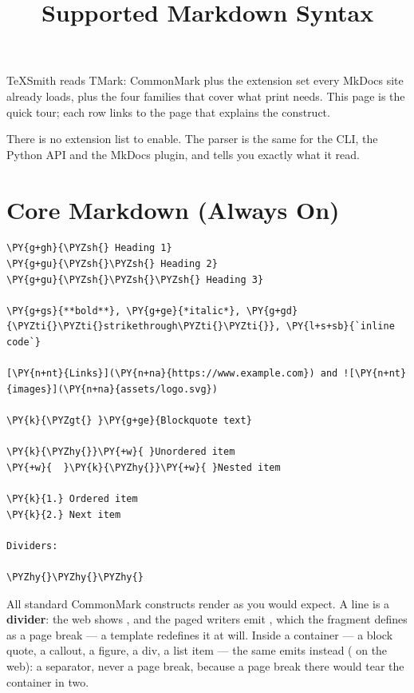 \documentclass[a4paper,twoside]{article}
\title{Supported Markdown Syntax}
\author{}\date{}
\begin{document}
\maketitle
TeXSmith reads TMark: CommonMark plus the extension set every
MkDocs site already loads, plus the four families that cover what print needs.
This page is the quick tour; each row links to the page that explains the
construct.
\begin{tscallout}[kind=info, title={One dialect, no configuration}]
There is no extension list to enable. The parser is the same for the CLI,
the Python API and the MkDocs plugin, and  tells you
exactly what it read.
\end{tscallout}
\section{Core Markdown (Always On)}
\begin{tscode}[lang=md, engine=pygments]
\begin{Verbatim}[commandchars=\\\{\},breaklines, breakanywhere, commandchars=\\\{\}]
\PY{g+gh}{\PYZsh{} Heading 1}
\PY{g+gu}{\PYZsh{}\PYZsh{} Heading 2}
\PY{g+gu}{\PYZsh{}\PYZsh{}\PYZsh{} Heading 3}

\PY{g+gs}{**bold**}, \PY{g+ge}{*italic*}, \PY{g+gd}{\PYZti{}\PYZti{}strikethrough\PYZti{}\PYZti{}}, \PY{l+s+sb}{`inline code`}

[\PY{n+nt}{Links}](\PY{n+na}{https://www.example.com}) and ![\PY{n+nt}{images}](\PY{n+na}{assets/logo.svg})

\PY{k}{\PYZgt{} }\PY{g+ge}{Blockquote text}

\PY{k}{\PYZhy{}}\PY{+w}{ }Unordered item
\PY{+w}{  }\PY{k}{\PYZhy{}}\PY{+w}{ }Nested item

\PY{k}{1.} Ordered item
\PY{k}{2.} Next item

Dividers:

\PYZhy{}\PYZhy{}\PYZhy{}
\end{Verbatim}
\end{tscode}
All standard CommonMark constructs render as you would expect. A \tscodeinline{-\allowbreak{}-\allowbreak{}-\allowbreak{}} line is
a \textbf{divider}: the web shows , and the paged writers emit ,
which the  fragment defines as a page break --- a template
redefines it at will. Inside a container --- a block quote, a callout, a figure,
a \tscodeinline{:::} div, a list item --- the same \tscodeinline{-\allowbreak{}-\allowbreak{}-\allowbreak{}} emits  instead ( on the web): a separator, never a page break, because a page
break there would tear the container in two.
\end{document}
